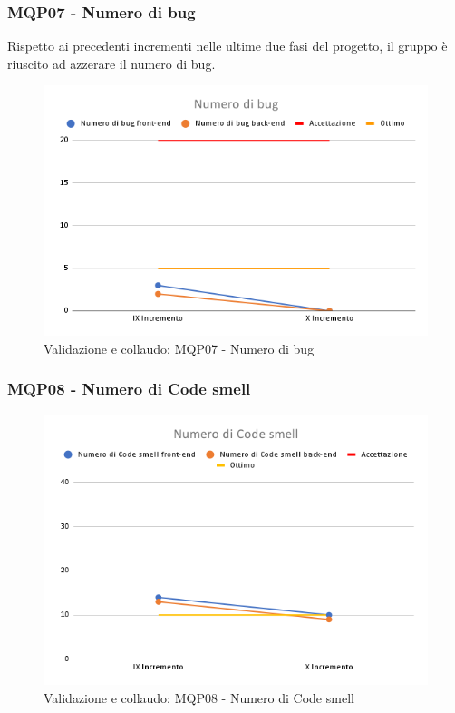 \subsubsection{MQP07 - Numero di bug}
Rispetto ai precedenti incrementi nelle ultime due fasi del progetto, il gruppo è riuscito ad azzerare il numero di bug.
\begin{figure}[H]
    \centering
    \includegraphics[scale=0.50]{Sezioni/images/last_prodotto/Numero_di_bug.png}
    \caption{Validazione e collaudo: MQP07 - Numero di bug}
\end{figure}
\subsubsection{MQP08 - Numero di Code smell}
\begin{figure}[H]
    \centering
    \includegraphics[scale=0.50]{Sezioni/images/last_prodotto/Numero_di_Code_smell.png}
    \caption{Validazione e collaudo: MQP08 - Numero di Code smell}
\end{figure}

